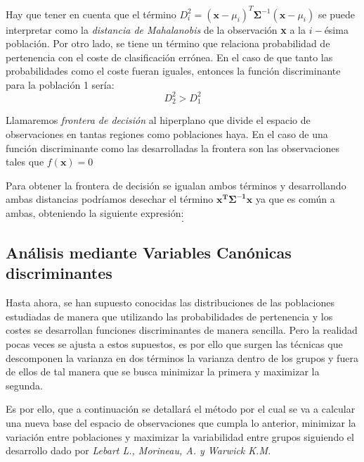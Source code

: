 \noindent Hay que tener en cuenta que el término $D_i^2=(\textbf{x}-\mu_i)^T \mathbf{\Sigma}^{-1} (\textbf{x}-\mu_i)$ se puede interpretar como la \emph{distancia de Mahalanobis} de la observación \textbf{x} a la $i-$ésima población. Por otro lado, se tiene un término que relaciona probabilidad de pertenencia con el coste de clasificación errónea. En el caso de que tanto las probabilidades como el coste fueran iguales, entonces la función discriminante para la población 1 sería:
\begin{equation}
D_2^2 > D_1^2
\end{equation}

\begin{defi}
Llamaremos \emph{frontera de decisión} al hiperplano que divide el espacio de observaciones en tantas regiones como poblaciones haya. En el caso de una función discriminante como las desarrolladas la frontera son las observaciones tales que $f(\textbf{x})=0$
\end{defi}
\noindent Para obtener la frontera de decisión se igualan ambos términos y desarrollando ambas distancias podríamos desechar el término $\mathbf{x^T\Sigma^{-1} x}$ ya que es común a ambas, obteniendo la siguiente expresión:
\begin{equation}
.
\end{equation}



\subsection{Análisis mediante Variables Canónicas discriminantes}

\noindent Hasta ahora, se han supuesto conocidas las distribuciones de las poblaciones estudiadas de manera que utilizando las probabilidades de pertenencia y los costes se desarrollan funciones discriminantes de manera sencilla. Pero la realidad pocas veces se ajusta a estos supuestos, es por ello que surgen las técnicas que descomponen la varianza en dos términos la varianza dentro de los grupos y fuera de ellos de tal manera que se busca minimizar la primera y maximizar la segunda. 

\noindent Es por ello, que a continuación se detallará el método por el cual se va a calcular una nueva base del espacio de observaciones que cumpla lo anterior, minimizar la variación entre poblaciones y maximizar la variabilidad entre grupos siguiendo el desarrollo dado por \textit{Lebart L., Morineau, A. y Warwick K.M.} \cite{Lebart 1984} 

